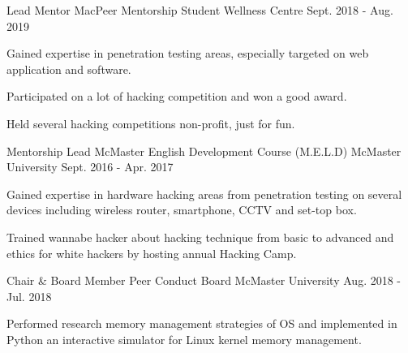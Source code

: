 
\begin{cventries}

  \cventry
    {Lead Mentor} %
    {MacPeer Mentorship} %
    {Student Wellness Centre} %
    {Sept. 2018 - Aug. 2019} %
    {
      \begin{cvitems} %
        \item {Gained expertise in penetration testing areas, especially targeted on web application and software.}
        \item {Participated on a lot of hacking competition and won a good award.}
        \item {Held several hacking competitions non-profit, just for fun.}
      \end{cvitems}
    }

  \cventry
    {Mentorship Lead} %
    {McMaster English Development Course (M.E.L.D)} %
    {McMaster University} %
    {Sept. 2016 - Apr. 2017} %
    {
      \begin{cvitems} %
        \item {Gained expertise in hardware hacking areas from penetration testing on several devices including wireless router, smartphone, CCTV and set-top box.}
        \item {Trained wannabe hacker about hacking technique from basic to advanced and ethics for white hackers by hosting annual Hacking Camp.}
      \end{cvitems}
    }

  \cventry
    {Chair \& Board Member} %
    {Peer Conduct Board}
    {McMaster University} %
    {Aug. 2018 - Jul. 2018} %
    {
      \begin{cvitems} %
        \item {Performed research memory management strategies of OS and implemented in Python an interactive simulator for Linux kernel memory management.}
      \end{cvitems}
    }
\end{cventries}

